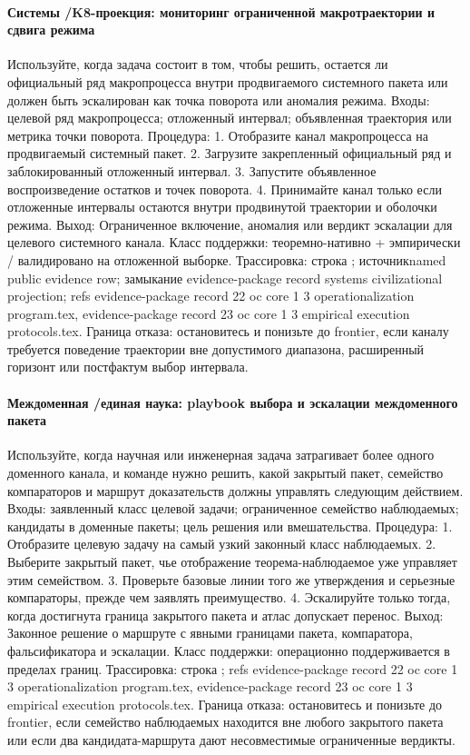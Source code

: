 \paragraph{Системы /\allowbreak K8-проекция: мониторинг ограниченной макротраектории и сдвига режима}
Используйте, когда задача состоит в том, чтобы решить, остается ли официальный ряд макропроцесса внутри продвигаемого системного пакета или должен быть эскалирован как точка поворота или аномалия режима.
Входы: целевой ряд макропроцесса; \allowbreak отложенный интервал; \allowbreak объявленная траектория или метрика точки поворота.
Процедура: 1. Отобразите канал макропроцесса на продвигаемый системный пакет. 2. Загрузите закрепленный официальный ряд и заблокированный отложенный интервал. 3. Запустите объявленное воспроизведение остатков и точек поворота. 4. Принимайте канал только если отложенные интервалы остаются внутри продвинутой траектории и оболочки режима.
Выход: Ограниченное включение, аномалия или вердикт эскалации для целевого системного канала.
Класс поддержки: теоремно-нативно + эмпирически / валидировано на отложенной выборке.
Трассировка: строка ; \allowbreak источникnamed public evidence row; \allowbreak замыкание evidence-package record systems civilizational projection; \allowbreak refs evidence-package record 22 oc core 1 3 operationalization program.tex, \allowbreak evidence-package record 23 oc core 1 3 empirical execution protocols.tex.
Граница отказа: остановитесь и понизьте до frontier, если каналу требуется поведение траектории вне допустимого диапазона, расширенный горизонт или постфактум выбор интервала.

\paragraph{Междоменная /\allowbreak единая наука: playbook выбора и эскалации междоменного пакета}
Используйте, когда научная или инженерная задача затрагивает более одного доменного канала, и команде нужно решить, какой закрытый пакет, семейство компараторов и маршрут доказательств должны управлять следующим действием.
Входы: заявленный класс целевой задачи; \allowbreak ограниченное семейство наблюдаемых; \allowbreak кандидаты в доменные пакеты; \allowbreak цель решения или вмешательства.
Процедура: 1. Отобразите целевую задачу на самый узкий законный класс наблюдаемых. 2. Выберите закрытый пакет, чье отображение теорема-наблюдаемое уже управляет этим семейством. 3. Проверьте базовые линии того же утверждения и серьезные компараторы, прежде чем заявлять преимущество. 4. Эскалируйте только тогда, когда достигнута граница закрытого пакета и атлас допускает перенос.
Выход: Законное решение о маршруте с явными границами пакета, компаратора, фальсификатора и эскалации.
Класс поддержки: операционно поддерживается в пределах границ.
Трассировка: строка ; \allowbreak refs evidence-package record 22 oc core 1 3 operationalization program.tex, \allowbreak evidence-package record 23 oc core 1 3 empirical execution protocols.tex.
Граница отказа: остановитесь и понизьте до frontier, если семейство наблюдаемых находится вне любого закрытого пакета или если два кандидата-маршрута дают несовместимые ограниченные вердикты.

